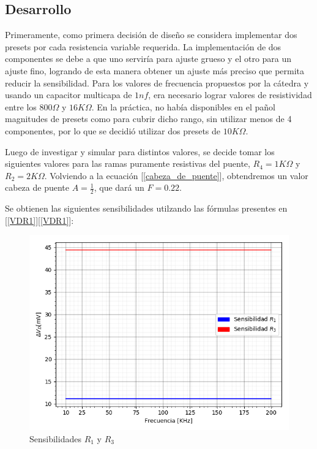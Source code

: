 \subsection{Desarrollo}
Primeramente, como primera decisión de diseño se considera implementar dos presets por cada resistencia variable requerida. La implementación de dos componentes se debe a que uno serviría para ajuste grueso y el otro para un ajuste fino, logrando de esta manera obtener un ajuste más preciso que permita reducir la sensibilidad. Para los valores de frecuencia propuestos por la cátedra y usando un capacitor multicapa de $1nf$, era necesario lograr valores de resistividad entre los $800 \Omega$ y $16K\Omega$. En la práctica, no había disponibles en el pañol magnitudes de presets como para cubrir dicho rango, sin utilizar menos de 4 componentes, por lo que se decidió utilizar dos presets de $10K\Omega$.
\par 
Luego de investigar y simular para distintos valores, se decide tomar los siguientes valores para las ramas puramente resistivas del puente, $R_4=1K\Omega$ y $R_2=2K\Omega$. Volviendo a la ecuación [\ref{cabeza_de_puente}], obtendremos un valor cabeza de puente $A=\frac{1}{2}$, que dará un $F=0.22$.

Se obtienen las siguientes sensibilidades utilzando las fórmulas presentes en [\ref{VDR1}][\ref{VDR1}]:
\begin{figure}[H]
\centering
\includegraphics[scale=0.7]{Graficos/Sensibilidad}
\caption{Sensibilidades $R_1$ y $R_3$}
\label{fig:Sensibilidades}
\end{figure}

